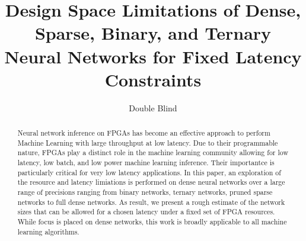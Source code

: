 \documentclass[sigchi]{acmart}
\begin{document}
\title{Design Space Limitations of Dense, Sparse, Binary, and Ternary
  Neural Networks for Fixed Latency Constraints }

\author{Double Blind}

\renewcommand{\shortauthors}{DB}

\begin{abstract}
Neural network inference on FPGAs has become an effective approach to
perform Machine Learning with large throughput at low
latency. Due to their programmable nature, FPGAs play a distinct role
in the machine learning community  allowing for low latency, low batch,
and low power machine learning inference. Their importantce is particularly
critical for very low latency applications. In this paper, an
exploration of the resource and latency limiations is performed on dense neural networks over a large range of precisions ranging from
binary networks, ternary networks, pruned sparse networks to full
dense networks. As result, we present a rough estimate of the network
sizes that can be allowed for a chosen latency under a fixed set of
FPGA resources. While focus is placed on dense networks, this work is
broadly applicable to all machine learning algorithms.  
\end{abstract}

\end{document}

